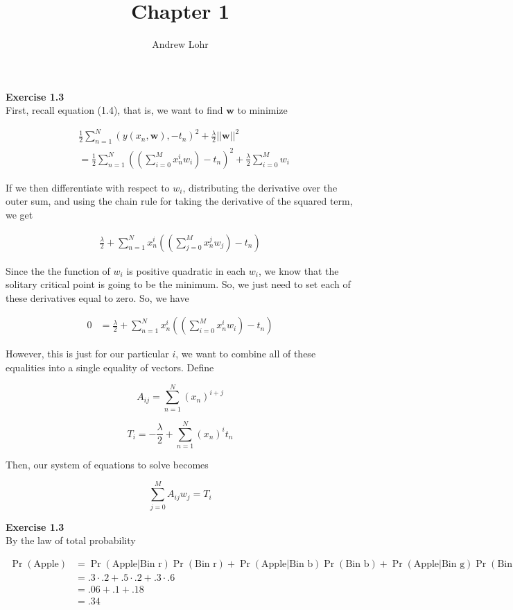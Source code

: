 \documentclass{article}
\title{Chapter 1}
\author{Andrew Lohr}
\begin{document}
\maketitle

\noindent\textbf{Exercise 1.3}\\

First, recall equation (1.4), that is, we want to find $\textbf{w}$ to minimize

\begin{align*}
&\frac{1}{2}\sum_{n=1}^N (y(x_n,\textbf{w}),-t_n)^2 + \frac{\lambda}{2} ||\textbf{w}||^2 \\
&=\frac{1}{2}\sum_{n=1}^N \left(\left(\sum_{i=0}^M x_n^i w_i\right)-t_n\right)^2 + \frac{\lambda}{2} \sum_{i=0}^M w_i
\end{align*}

If we then differentiate with respect to $w_i$, distributing the derivative over the outer sum, and using the chain rule for taking the derivative of the squared term, we get

\begin{align*}
\frac{\lambda}{2} + \sum_{n=1}^N x_n^i \left( \left( \sum_{j=0}^M x_n^j w_j\right) - t_n\right)
\end{align*}

Since the the function of $w_i$ is positive quadratic in each $w_i$, we know that the solitary critical point is going to be the minimum. So, we just need to set each of these derivatives equal to zero. So, we have

\begin{align*}
0 &= \frac{\lambda}{2} + \sum_{n=1}^N x_n^i \left( \left( \sum_{i=0}^M x_n^i w_i\right) - t_n\right)
\end{align*}

However, this is just for our particular $i$, we want to combine all of these equalities into a single equality of vectors. Define

\[
A_{ij} = \sum_{n=1}^{N} (x_n )^{i+j}
\]

\[
T_i = -\frac{\lambda}{2} + \sum_{n=1}^N (x_n)^it_n
\]

Then, our system of equations to solve becomes

\[
\sum_{j=0}^M A_{ij}w_j = T_i
\]

\noindent\textbf{Exercise 1.3}\\

By the law of total probability

\begin{align*}
\Pr(\text{Apple}) &= \Pr(\text{Apple}|\text{Bin r})\Pr(\text{Bin r}) + \Pr(\text{Apple} | \text{Bin b})\Pr(\text{Bin b}) + \Pr(\text{Apple} | \text{Bin g})\Pr(\text{Bin g})\\
&=.3 \cdot .2 + .5 \cdot .2 + .3 \cdot .6\\
&= .06 + .1 + .18\\
&= .34
\end{align*}
\end{document}
